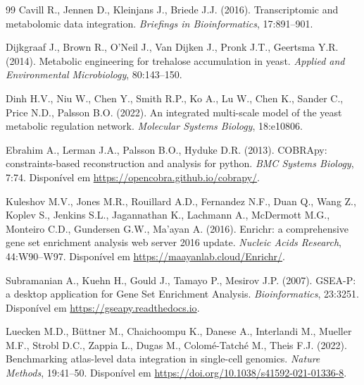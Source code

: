 \begin{thebibliography}{99}
 Cavill R., Jennen D., Kleinjans J., Briede J.J. (2016).
Transcriptomic and metabolomic data integration. \textit{Briefings in
Bioinformatics}, 17:891--901.

 Dijkgraaf J., Brown R., O'Neil J., Van Dijken J., Pronk J.T.,
Geertsma Y.R. (2014). Metabolic engineering for trehalose accumulation in
yeast. \textit{Applied and Environmental Microbiology}, 80:143--150.

 Dinh H.V., Niu W., Chen Y., Smith R.P., Ko A., Lu W., Chen K.,
Sander C., Price N.D., Palsson B.O. (2022). An integrated multi-scale
model of the yeast metabolic regulation network. \textit{Molecular Systems
Biology}, 18:e10806.

 Ebrahim A., Lerman J.A., Palsson B.O., Hyduke D.R. (2013).
COBRApy: constraints-based reconstruction and analysis for python. \textit{BMC
Systems Biology}, 7:74. Disponível em \url{https://opencobra.github.io/cobrapy/}.

 Kuleshov M.V., Jones M.R., Rouillard A.D., Fernandez N.F.,
Duan Q., Wang Z., Koplev S., Jenkins S.L., Jagannathan K., Lachmann A.,
McDermott M.G., Monteiro C.D., Gundersen G.W., Ma'ayan A. (2016). Enrichr:
a comprehensive gene set enrichment analysis web server 2016 update.
\textit{Nucleic Acids Research}, 44:W90--W97. Disponível em
\url{https://maayanlab.cloud/Enrichr/}.

 Subramanian A., Kuehn H., Gould J., Tamayo P., Mesirov J.P.
(2007). GSEA-P: a desktop application for Gene Set Enrichment Analysis.
\textit{Bioinformatics}, 23:3251. Disponível em
\url{https://gseapy.readthedocs.io}.

 Luecken M.D., Büttner M., Chaichoompu K., Danese A.,
Interlandi M., Mueller M.F., Strobl D.C., Zappia L., Dugas M.,
Colomé-Tatché M., Theis F.J. (2022). Benchmarking atlas-level data
integration in single-cell genomics. \textit{Nature Methods},
19:41--50. Disponível em \url{https://doi.org/10.1038/s41592-021-01336-8}.
\end{thebibliography}
